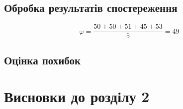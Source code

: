 \subsection{Обробка результатів спостереження}

\begin{equation}
  \varphi = \frac{50 + 50 + 51 + 45 + 53}{5} = 49
\end{equation}

\subsection{Оцінка похибок}

\section*{Висновки до розділу 2}
